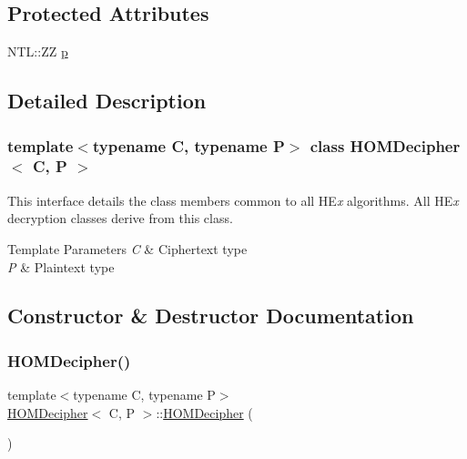 \subsection*{Protected Attributes}
\begin{DoxyCompactItemize}
\item 
N\+T\+L\+::\+ZZ \hyperlink{classHOMDecipher_a434f26bd73b3f9ee8bf999278d78a26c}{p}
\end{DoxyCompactItemize}


\subsection{Detailed Description}
\subsubsection*{template$<$typename C, typename P$>$\newline
class H\+O\+M\+Decipher$<$ C, P $>$}

This interface details the class members common to all HE{\itshape x} algorithms. All HE{\itshape x} decryption classes derive from this class. 
\begin{DoxyTemplParams}{Template Parameters}
{\em C} & Ciphertext type \\
\hline
{\em P} & Plaintext type \\
\hline
\end{DoxyTemplParams}


\subsection{Constructor \& Destructor Documentation}
\mbox{\label{classHOMDecipher_ab98e34714b534c4e02d08d952befa62b}} 
\subsubsection{\texorpdfstring{H\+O\+M\+Decipher()}{HOMDecipher()}}
{\footnotesize\ttfamily template$<$typename C, typename P$>$ \\
\hyperlink{classHOMDecipher}{H\+O\+M\+Decipher}$<$ C, P $>$\+::\hyperlink{classHOMDecipher}{H\+O\+M\+Decipher} (\begin{DoxyParamCaption}{ }\end{DoxyParamCaption})\hspace{0.3cm}{\ttfamily [inline]}}

